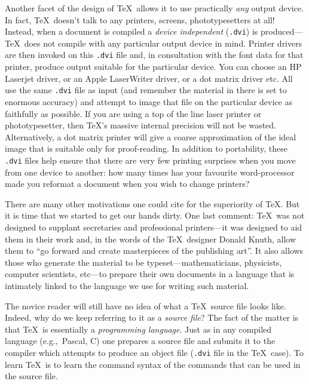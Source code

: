 Another facet of the design of \TeX\ allows it to use
practically {\em any\/} output device.  In fact, \TeX\
doesn't talk to any printers, screens, phototypesetters
at all!  Instead, when a document is compiled a
{\em device independent\/} ({\tt .dvi}) is produced---%
\TeX\ does not compile with any particular output
device in mind.  Printer drivers are then invoked on
this {\tt .dvi} file and, in consultation with the font
data for that printer, produce output suitable for the
particular device.  You can choose an HP Laserjet
driver, or an Apple LaserWriter driver, or a dot matrix
driver etc.  All use the same {\tt .dvi} file as input (and
remember the material in there is set to enormous
accuracy) and attempt to image that file on the particular
device as faithfully as possible.  If you are using a top of the
line laser printer or phototypesetter, then \TeX's
massive internal precision will not be wasted.  Alternatively,
a dot matrix printer
will give a coarse approximation of the ideal image that is
suitable only for proof-reading.  In addition to portability,
these {\tt .dvi} files help ensure that there are very few printing
surprises when you move from one device to another:  how many times
has your favourite word-processor made you reformat a document when
you wish to change printers?

There are many other motivations one could cite for the
superiority of \TeX.    But it is time that we started to get
our hands dirty.  One last comment:  \TeX\ was not designed
to supplant secretaries and professional printers---it was designed
to aid them in their work and, in the words of the \TeX\ designer
Donald Knuth, allow them to ``go forward and create masterpieces
of the publishing art''.%
It also allows those who generate the material
to be typeset---mathematicians, physicists, computer scientists, etc---to
prepare their own documents in a language that is intimately linked
to the language we use for writing such material.

The novice reader will still have no idea of what a \TeX\ source file
looks like.  Indeed, why do we keep referring to it as a {\em source
file}?  The fact of the matter is that \TeX\ is essentially a
{\em programming language}.  Just as in any compiled language
(e.g.,\ Pascal, C) one prepares a source file and submits it to the
compiler which attempts to produce an object file ({\tt .dvi} file
in the \TeX\ case).  To learn \TeX\ is to learn the command syntax
of the commands that can be used in the source file.

